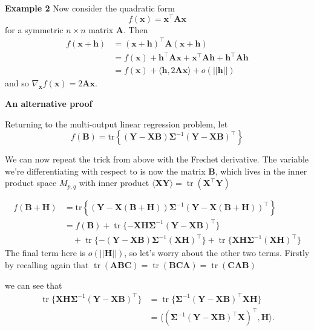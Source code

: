 \documentclass[
]{book}
\theoremstyle{definition}
\theoremstyle{definition}
\theoremstyle{definition}
\theoremstyle{definition}
\theoremstyle{remark}
\begin{document}
\textbf{Example 2}
Now consider the quadratic form
\[f(\mathbf x) = \mathbf x^\top \mathbf A\mathbf x\]
for a symmetric \(n\times n\) matrix \(\mathbf A\). Then
\begin{align}
f(\mathbf x+\mathbf h)&=(\mathbf x+\mathbf h)^\top \mathbf A(\mathbf x+\mathbf h)\\
&= f(\mathbf x)+\mathbf h^\top \mathbf A\mathbf x+ \mathbf x^\top \mathbf A\mathbf h+ \mathbf h^\top\mathbf A\mathbf h\\
&= f(\mathbf x)+\langle\mathbf h, 2\mathbf A\mathbf x\rangle +  o(||\mathbf h||)
\end{align}
and so \(\nabla_\mathbf xf(\mathbf x) =2\mathbf A\mathbf x.\)

\textbf{An alternative proof}

Returning to the multi-output linear regression problem, let
\[f(\mathbf B)= \text{tr}\left \{
(\mathbf Y-\mathbf X\mathbf B) \boldsymbol{\Sigma}^{-1} (\mathbf Y- \mathbf X\mathbf B)^\top\right \}\]

We can now repeat the trick from above with the Frechet derivative. The variable we're differentiating with respect to is now the matrix \(\mathbf B\), which lives in the inner product space \(M_{p,q}\) with inner product \(\langle \mathbf X\mathbf Y\rangle =\operatorname{tr}(\mathbf X^\top \mathbf Y)\)

\begin{align}
f(\mathbf B+\mathbf H) &=\text{tr}\left \{
(\mathbf Y-\mathbf X(\mathbf B+\mathbf H)) \boldsymbol{\Sigma}^{-1} (\mathbf Y- \mathbf X(\mathbf B+\mathbf H))^\top\right\}\\
&=f(\mathbf B)+\operatorname{tr}\{-\mathbf X\mathbf H\boldsymbol{\Sigma}^{-1}(\mathbf Y-\mathbf X\mathbf B)^\top\}\\
&\quad +\operatorname{tr}\{-(\mathbf Y-\mathbf X\mathbf B)\boldsymbol{\Sigma}^{-1}(\mathbf X\mathbf H)^\top\}+\operatorname{tr}\{\mathbf X\mathbf H\boldsymbol{\Sigma}^{-1}(\mathbf X\mathbf H)^\top\}
\end{align}
The final term here is \(o(||\mathbf H||)\), so let's worry about the other two terms. Firstly by recalling again that \(\operatorname{tr}(\mathbf A\mathbf B\mathbf C)=\operatorname{tr}(\mathbf B\mathbf C\mathbf A)=\operatorname{tr}(\mathbf C\mathbf A\mathbf B)\)

we can see that
\begin{align}
\operatorname{tr}\{\mathbf X\mathbf H\boldsymbol{\Sigma}^{-1}(\mathbf Y-\mathbf X\mathbf B)^\top\} &= \operatorname{tr}\{\boldsymbol{\Sigma}^{-1}(\mathbf Y-\mathbf X\mathbf B)^\top \mathbf X\mathbf H\}\\
&=\langle (\boldsymbol{\Sigma}^{-1}(\mathbf Y-\mathbf X\mathbf B)^\top \mathbf X)^\top, \mathbf H\rangle.
\end{align}
\end{document}
